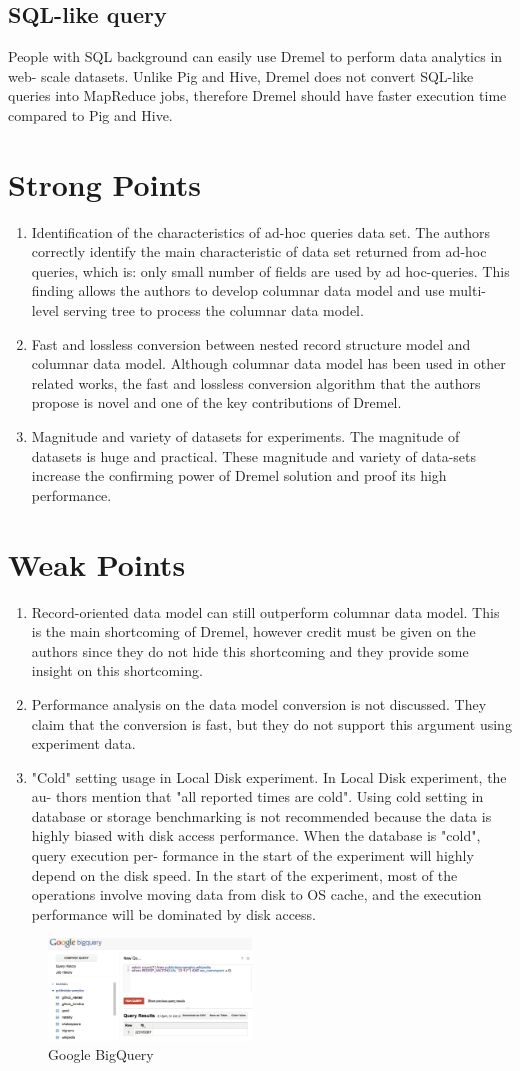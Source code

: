 \documentclass[twocolumn]{article}
\newcommand{\be}{\begin{enumerate}}
\newcommand{\ee}{\end{enumerate}}
\newcommand{\ii}{\item}
\begin{document}
\subsection{SQL-like query}
People with SQL background can easily use Dremel to perform data analytics in web- scale datasets. Unlike Pig and Hive, Dremel does not convert SQL-like queries into MapReduce jobs, therefore Dremel should have faster execution time compared to Pig and Hive.

\section{Strong Points}
\be
\ii Identification of the characteristics of ad-hoc queries data set.
The authors correctly identify the main characteristic of data set returned from ad-hoc queries, which is: only small number of fields are used by ad hoc-queries. This finding allows the authors to develop columnar data model and use multi-level serving tree to process the columnar data model.
\ii Fast and lossless conversion between nested record structure model and columnar data model.
Although columnar data model has been used in other related works, the fast and lossless conversion algorithm that the authors propose is novel and one of the key contributions of Dremel.
\ii Magnitude and variety of datasets for experiments.
The magnitude of datasets is huge and practical. These magnitude and variety of data-sets increase the confirming power of Dremel solution and proof its high performance.
\ee
\section{Weak Points}
\be
\ii Record-oriented data model can still outperform columnar data model. This is the main shortcoming of Dremel, however credit must be given on the authors since they do not hide this shortcoming and they provide some insight on this shortcoming.
\ii Performance analysis on the data model conversion is not discussed. They claim that the conversion is fast, but they do not support this argument using experiment data.
\ii "Cold" setting usage in Local Disk experiment. In Local Disk experiment, the au- thors mention that "all reported times are cold". Using cold setting in database or storage benchmarking is not recommended because the data is highly biased with disk access performance. When the database is "cold", query execution per- formance in the start of the experiment will highly depend on the disk speed. In the start of the experiment, most of the operations involve moving data from disk to OS cache, and the execution performance will be dominated by disk access.
\ee
\begin{figure}[htb]
        \centering
        \includegraphics[width=0.48\textwidth]{google-bigquery.png}
        \caption{Google BigQuery}
        \label{fig:bigquery}
\end{figure}
\end{document}
